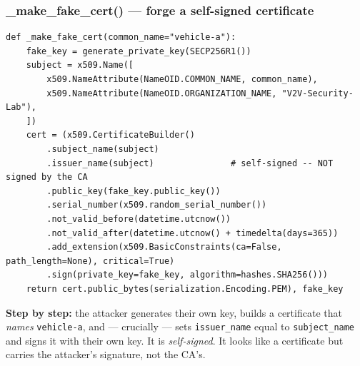\documentclass[11pt,a4paper]{article}
\begin{document}
\subsubsection*{\_make\_fake\_cert() --- forge a self-signed certificate}
\begin{lstlisting}[style=py,caption={mitm\_attack.py --- building a fake (self-signed) certificate.}]
def _make_fake_cert(common_name="vehicle-a"):
    fake_key = generate_private_key(SECP256R1())
    subject = x509.Name([
        x509.NameAttribute(NameOID.COMMON_NAME, common_name),
        x509.NameAttribute(NameOID.ORGANIZATION_NAME, "V2V-Security-Lab"),
    ])
    cert = (x509.CertificateBuilder()
        .subject_name(subject)
        .issuer_name(subject)               # self-signed -- NOT signed by the CA
        .public_key(fake_key.public_key())
        .serial_number(x509.random_serial_number())
        .not_valid_before(datetime.utcnow())
        .not_valid_after(datetime.utcnow() + timedelta(days=365))
        .add_extension(x509.BasicConstraints(ca=False, path_length=None), critical=True)
        .sign(private_key=fake_key, algorithm=hashes.SHA256()))
    return cert.public_bytes(serialization.Encoding.PEM), fake_key
\end{lstlisting}
\textbf{Step by step:} the attacker generates their own key, builds a certificate
that \emph{names} \texttt{vehicle-a}, and --- crucially --- sets
\texttt{issuer\_name} equal to \texttt{subject\_name} and signs it with their own
key. It is \emph{self-signed}. It looks like a certificate but carries the
attacker's signature, not the CA's.
\end{document}
